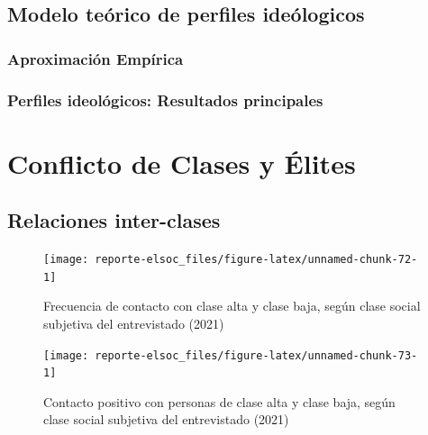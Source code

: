 \documentclass[
  12pt,
  openany]{book}
\begin{document}
\hypertarget{modelo-teuxf3rico-de-perfiles-ideuxf3logicos}{%
\section{Modelo teórico de perfiles ideólogicos}\label{modelo-teuxf3rico-de-perfiles-ideuxf3logicos}}

\hypertarget{aproximaciuxf3n-empuxedrica}{%
\subsection{Aproximación Empírica}\label{aproximaciuxf3n-empuxedrica}}

\hypertarget{perfiles-ideoluxf3gicos-resultados-principales}{%
\subsection{Perfiles ideológicos: Resultados principales}\label{perfiles-ideoluxf3gicos-resultados-principales}}

\hypertarget{conflicto-de-clases-y-uxe9lites}{%
\chapter{Conflicto de Clases y Élites}\label{conflicto-de-clases-y-uxe9lites}}

\hypertarget{relaciones-inter-clases}{%
\section{Relaciones inter-clases}\label{relaciones-inter-clases}}

\begin{figure}

{\centering \texttt{[image: reporte-elsoc\_files/figure-latex/unnamed-chunk-72-1]} 

}

\caption{Frecuencia de contacto con clase alta y clase baja, según clase social subjetiva del entrevistado (2021)}\label{fig:unnamed-chunk-72}
\end{figure}

\begin{figure}

{\centering \texttt{[image: reporte-elsoc\_files/figure-latex/unnamed-chunk-73-1]} 

}

\caption{Contacto positivo con personas de clase alta y clase baja, según clase social subjetiva del entrevistado (2021)}\label{fig:unnamed-chunk-73}
\end{figure}
\end{document}
